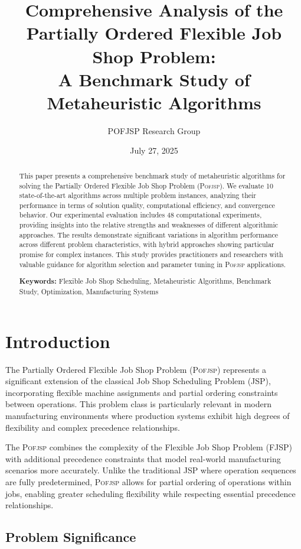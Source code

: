 \documentclass[11pt,a4paper]{article}
\title{Comprehensive Analysis of the Partially Ordered Flexible Job Shop Problem: \\
A Benchmark Study of Metaheuristic Algorithms}
\author{POFJSP Research Group}
\date{July 27, 2025}
\newcommand{\pofjsp}{\textsc{Pofjsp}}
\begin{document}
\maketitle


\begin{abstract}
This paper presents a comprehensive benchmark study of metaheuristic algorithms for solving the Partially Ordered Flexible Job Shop Problem (\pofjsp). We evaluate 10 state-of-the-art algorithms across multiple problem instances, analyzing their performance in terms of solution quality, computational efficiency, and convergence behavior. Our experimental evaluation includes 48 computational experiments, providing insights into the relative strengths and weaknesses of different algorithmic approaches. The results demonstrate significant variations in algorithm performance across different problem characteristics, with hybrid approaches showing particular promise for complex instances. This study provides practitioners and researchers with valuable guidance for algorithm selection and parameter tuning in \pofjsp{} applications.

\textbf{Keywords:} Flexible Job Shop Scheduling, Metaheuristic Algorithms, Benchmark Study, Optimization, Manufacturing Systems
\end{abstract}


\section{Introduction}

The Partially Ordered Flexible Job Shop Problem (\pofjsp) represents a significant extension of the classical Job Shop Scheduling Problem (JSP), incorporating flexible machine assignments and partial ordering constraints between operations. This problem class is particularly relevant in modern manufacturing environments where production systems exhibit high degrees of flexibility and complex precedence relationships.

The \pofjsp{} combines the complexity of the Flexible Job Shop Problem (FJSP) with additional precedence constraints that model real-world manufacturing scenarios more accurately. Unlike the traditional JSP where operation sequences are fully predetermined, \pofjsp{} allows for partial ordering of operations within jobs, enabling greater scheduling flexibility while respecting essential precedence relationships.

\subsection{Problem Significance}
\end{document}
